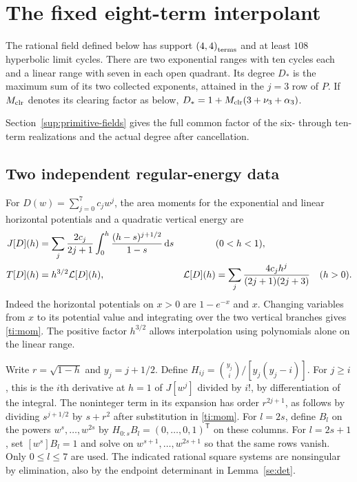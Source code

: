 \section{The fixed eight-term interpolant}\label{ti:sec:fixed8}
\begin{theorem}\label{ti:main}The rational field defined below has support \(\left(4,4\right)_{\mathrm{terms}}\) and at least \(108\) hyperbolic limit cycles. There are two exponential ranges with ten cycles each and a linear range with seven in each open quadrant. Its degree \(D_*\) is the maximum sum of its two collected exponents, attained in the \(j=3\) row of \(P\). If \(M_{\mathrm{clr}}{}\) denotes its clearing factor as below, \(D_*=1+M_{\mathrm{clr}}{}(3+\nu_3+\alpha_3)\).\end{theorem}
Section~\ref{sup:primitive-fields} gives the full common factor of the six- through ten-term realizations and the actual degree after cancellation.

\subsection{Two independent regular-energy data}
For $D(w)=\sum_{j=0}^7 c_j w^j$, the area moments for the exponential and
linear horizontal potentials and a quadratic vertical energy are
\begin{align}
 J[D](h)&=\sum_j\frac{2c_j}{2j+1}\int_0^h\frac{(h-s)^{j+1/2}}{1-s}\,\mathrm{d} s
                       &&(0<h<1),\notag\\
 T[D](h)&=h^{3/2}\mathcal L[D](h),&
 \mathcal L[D](h)&=\sum_j\frac{4c_j h^j}{(2j+1)(2j+3)}\quad(h>0).
 \label{ti:mom}
\end{align}
Indeed the horizontal potentials on $x>0$ are $1-e^{-x}$ and $x$.
Changing variables from $x$ to its potential value and integrating over the
two vertical branches gives \eqref{ti:mom}. The positive factor $h^{3/2}$
allows interpolation using polynomials alone on the linear range.

Write $r=\sqrt{1-h}$ and $y_j=j+1/2$. Define
$H_{ij}=\binom{y_j}{i}/[y_j(y_j-i)]$.
For $j\ge i$, this is the $i$th derivative at $h=1$ of $J[w^j]$ divided
by $i!$, by differentiation of the integral. The noninteger term in its
expansion has order $r^{2j+1}$, as follows by dividing $s^{j+1/2}$
by $s+r^2$ after substitution in \eqref{ti:mom}.
For $l=2s$, define $B_l$ on the powers $w^s,\ldots,w^{2s}$ by
$H_{0:s} B_l=(0,\ldots,0,1)^{\mathsf T}$ on these columns.
For $l=2s+1$, set $[w^s]B_l=1$ and solve on $w^{s+1},\ldots,w^{2s+1}$
so that the same rows vanish. Only $0\le l\le7$ are used.
The indicated rational square systems are nonsingular by elimination, also
by the endpoint determinant in Lemma~\ref{se:det}.

